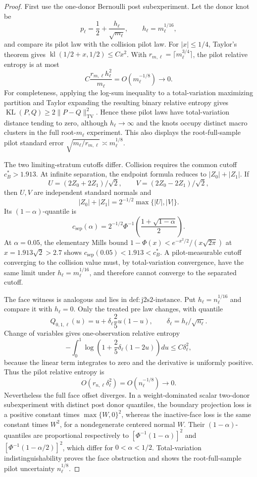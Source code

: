 \documentclass{article}
\begin{document}
\begin{proof}
First use the one-donor Bernoulli post subexperiment.  Let the donor knot be
\[
 p_\ell=\frac12+\frac{h_\ell}{\sqrt{m_\ell}},
 \qquad h_\ell=m_\ell^{1/16},
\]
and compare its pilot law with the collision pilot law.  For \(|x|\leq1/4\), Taylor's theorem gives
\(\operatorname{kl}(1/2+x,1/2)\leq Cx^2\).  With
\(r_{m,\ell}=\lceil m_\ell^{3/4}\rceil\), the pilot relative entropy is at most
\[
 C\frac{r_{m,\ell}h_\ell^2}{m_\ell}
 =O(m_\ell^{-1/8})\longrightarrow0.
\]
For completeness, applying the log-sum inequality to a total-variation maximizing partition and Taylor expanding the resulting binary relative entropy gives
\(\operatorname{KL}(P,Q)\geq2\|P-Q\|_{\mathrm{TV}}^2\).  Hence these pilot laws have total-variation distance tending to zero, although \(h_\ell\to\infty\) and the knots occupy distinct macro clusters in the full root-\(m_\ell\) experiment.  This also displays the root-full-sample pilot standard error
\(\sqrt{m_\ell/r_{m,\ell}}\asymp m_\ell^{1/8}\).

The two limiting-stratum cutoffs differ.  Collision requires the common cutoff \(c_B^*>1.913\).  At infinite separation, the endpoint formula reduces to \(|Z_0|+|Z_1|\).  If
\[
 U=(2Z_0+2Z_1)/\sqrt2,\qquad V=(2Z_0-2Z_1)/\sqrt2,
\]
then \(U,V\) are independent standard normals and
\[
 |Z_0|+|Z_1|=2^{-1/2}\max\{|U|,|V|\}.
\]
Its \((1-\alpha)\)-quantile is
\[
 c_{\mathrm{sep}}(\alpha)=2^{-1/2}
 \Phi^{-1}\left(\frac{1+\sqrt{1-\alpha}}2\right).
\]
At \(\alpha=0.05\), the elementary Mills bound
\(1-\Phi(x)<e^{-x^2/2}/(x\sqrt{2\pi})\) at
\(x=1.913\sqrt2>2.7\) shows
\(c_{\mathrm{sep}}(0.05)<1.913<c_B^*\).  A pilot-measurable cutoff converging to the collision value must, by total-variation convergence, have the same limit under \(h_\ell=m_\ell^{1/16}\), and therefore cannot converge to the separated cutoff.

The face witness is analogous and lies in \(\mathrm{def:j2s2\mbox{-}instance}\).  Put \(h_\ell=n_\ell^{1/16}\) and compare it with \(h_\ell=0\).  Only the treated pre law changes, with quantile
\[
 Q_{0,1,\ell}(u)=u+\delta_\ell\frac25u(1-u),
 \qquad \delta_\ell=h_\ell/\sqrt{n_\ell}.
\]
Change of variables gives one-observation relative entropy
\[
 -\int_0^1\log\left(1+\frac25\delta_\ell(1-2u)\right)du
 \leq C\delta_\ell^2,
\]
because the linear term integrates to zero and the derivative is uniformly positive.  Thus the pilot relative entropy is
\[
 O(r_{n,\ell}\delta_\ell^2)=O(n_\ell^{-1/8})\longrightarrow0.
\]
Nevertheless the full face offset diverges.  In a weight-dominated scalar two-donor subexperiment with distinct post donor quantiles, the boundary projection loss is a positive constant times \(\max\{W,0\}^2\), whereas the inactive-face loss is the same constant times \(W^2\), for a nondegenerate centered normal \(W\).  Their \((1-\alpha)\)-quantiles are proportional respectively to
\([\Phi^{-1}(1-\alpha)]^2\) and
\([\Phi^{-1}(1-\alpha/2)]^2\), which differ for \(0<\alpha<1/2\).  Total-variation indistinguishability proves the face obstruction and shows the root-full-sample pilot uncertainty \(n_\ell^{1/8}\).


\end{proof}
\end{document}
